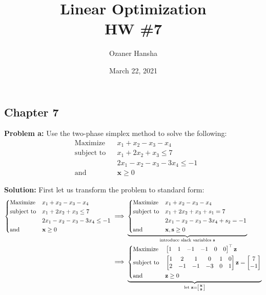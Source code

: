 \documentclass{article}
\newcommand{\icol}[1]{%
  \begin{bsmallmatrix}#1\end{bsmallmatrix}%
}
\renewcommand\vec{\mathbf}
\begin{document}
\title{Linear Optimization\\HW \#7}
\author{Ozaner Hansha}
\date{March 22, 2021}
\maketitle

\subsection*{Chapter 7}
\noindent\textbf{Problem a:} Use the two-phase simplex method to solve the following:
$$\begin{aligned}
    &{\text{Maximize}}
    &&x_1+x_2-x_3-x_4\\
    &{\text{subject to}}
    &&x_1+2x_2+x_3\le7\\
    &
    &&2x_1-x_2-x_3-3x_4\le-1\\
    &{\text{and}}
    &&\vec x\ge 0
\end{aligned}$$
\bigskip

\noindent\textbf{Solution:} First let us transform the problem to standard form:
\begin{align*}
    \left\{\begin{aligned}
        &{\text{Maximize}}
        &&x_1+x_2-x_3-x_4\\
        &{\text{subject to}}
        &&x_1+2x_2+x_3\le7\\
        &
        &&2x_1-x_2-x_3-3x_4\le-1\\
        &{\text{and}}
        &&\vec x\ge 0
    \end{aligned}\right.
    &\implies
    \underbrace{\left\{\begin{aligned}
        &{\text{Maximize}}
        &&x_1+x_2-x_3-x_4\\
        &{\text{subject to}}
        &&x_1+2x_2+x_3+s_1=7\\
        &
        &&2x_1-x_2-x_3-3x_4+s_2=-1\\
        &{\text{and}}
        &&\vec x,\vec s\ge 0
    \end{aligned}\right.}_{\text{introduce slack variables } \vec s}\\
    &\implies
    \underbrace{\left\{\begin{aligned}
        &{\text{Maximize}}
        &&\begin{bmatrix}
            1&1&-1&-1&0&0
        \end{bmatrix}^\top\vec z\\
        &{\text{subject to}}
        &&\begin{bmatrix}
            1&2&1&0&1&0\\
            2&-1&-1&-3&0&1
        \end{bmatrix}\vec z=\begin{bmatrix}
            7\\-1
        \end{bmatrix}\\
        &{\text{and}}
        &&\vec z\ge 0
    \end{aligned}\right.}_{\text{let }\vec z=\icol{\vec x\\\vec s}}
\end{align*}
\end{document}
